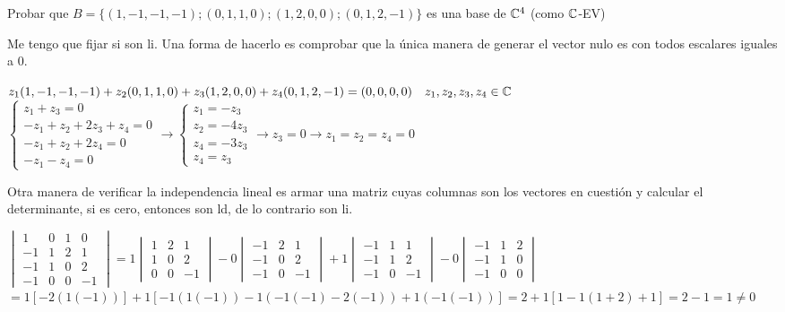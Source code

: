 \item Probar que $B=\{(1,-1,-1,-1);(0,1,1,0);(1,2,0,0);(0,1,2,-1)\}$ es una base de $\mathbb{C}^4$ (como $\mathbb{C}$-EV)
    \begin{mdframed}[style=s]
        Me tengo que fijar si son li. Una forma de hacerlo es comprobar que la única manera de generar el vector nulo es con todos escalares iguales a 0.
        \begin{center}
            $z_1(1,-1,-1,-1)+z_2(0,1,1,0)+z_3(1,2,0,0)+z_4(0,1,2,-1)=(0,0,0,0)\quad z_1,z_2,z_3,z_4\in\mathbb{C}$
            $\begin{cases}
                z_1+z_3=0\\
                -z_1+z_2+2z_3+z_4=0\\
                -z_1+z_2+2z_4=0\\
                -z_1-z_4=0
            \end{cases}\to\begin{cases}
                z_1=-z_3\\
                z_2=-4z_3\\
                z_4=-3z_3\\
                z_4=z_3
            \end{cases}\to z_3=0\to z_1=z_2=z_4=0$
        \end{center}
        Otra manera de verificar la independencia lineal es armar una matriz cuyas columnas son los vectores en cuestión y calcular el determinante, si es cero, entonces son ld, de lo contrario son li.
        \begin{tightcenter}
            $\begin{vmatrix}
                1&0&1&0\\
                -1&1&2&1\\
                -1&1&0&2\\
                -1&0&0&-1
            \end{vmatrix}=1\begin{vmatrix}
                1&2&1\\
                1&0&2\\
                0&0&-1
            \end{vmatrix}-0\begin{vmatrix}
                -1&2&1\\
                -1&0&2\\
                -1&0&-1
            \end{vmatrix}+1\begin{vmatrix}
                -1&1&1\\
                -1&1&2\\
                -1&0&-1
            \end{vmatrix}-0\begin{vmatrix}
                -1&1&2\\
                -1&1&0\\
                -1&0&0
            \end{vmatrix}$\\
            $=1[-2(1(-1))]+1[-1(1(-1))-1(-1(-1)-2(-1))+1(-1(-1))]=2+1[1-1(1+2)+1]=2-1=1\neq 0$
        \end{tightcenter}
    \end{mdframed}